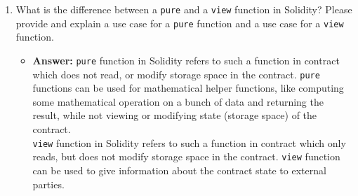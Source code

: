 \documentclass[11pt]{article}
\begin{document}
\begin{enumerate}
	\item What is the difference between a \texttt{pure} and a \texttt{view} function in Solidity? Please provide and explain a use case for a \texttt{pure} function and a use case for a \texttt{view} function.
	\begin{itemize}
	    \item \textbf{Answer: } \texttt{pure} function in Solidity refers to such a function in contract which does not read, or modify storage space in the contract. \texttt{pure} functions can be used for mathematical helper functions, like computing some mathematical operation on a bunch of data and returning the result, while not viewing or modifying state (storage space) of the contract.\\ \texttt{view} function in Solidity refers to such a function in contract which only reads, but does not modify storage space in the contract. \texttt{view} function can be used to give information about the contract state to external parties.
	\end{itemize}
	

\end{enumerate}
\end{document}
